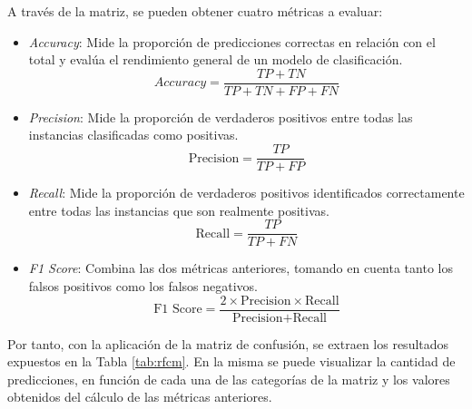 A través de la matriz, se pueden obtener cuatro métricas a evaluar: 

\vspace{3mm}

\begin{itemize}
  \item \textit{Accuracy}: Mide la proporción de predicciones correctas en relación con el total y evalúa el rendimiento general de un modelo de clasificación.
  \[\textit{Accuracy} = \frac{{TP + TN}}{{TP + TN + FP + FN}}\]
  \item \textit{Precision}: Mide la proporción de verdaderos positivos entre todas las instancias clasificadas como positivas.
  \[\text{Precision} = \frac{{TP}}{{TP + FP}}\]
  \item \textit{Recall}: Mide la proporción de verdaderos positivos identificados correctamente entre todas las instancias que son realmente positivas. 
  \[\text{Recall} = \frac{{TP}}{{TP + FN}}\]
  \item \textit{F1 Score}: Combina las dos métricas anteriores, tomando en cuenta tanto los falsos positivos como los falsos negativos.
  \[\text{F1 Score} = \frac{{2 \times \text{Precision} \times \text{Recall}}}{{\text{Precision} + \text{Recall}}}\]
\end{itemize}

Por tanto, con la aplicación de la matriz de confusión, se extraen los resultados expuestos en la Tabla \ref{tab:rfcm}. En la misma se puede visualizar la cantidad de predicciones, en función de cada una de las categorías de la matriz y los valores obtenidos del cálculo de las métricas anteriores.

\vspace{3mm}


